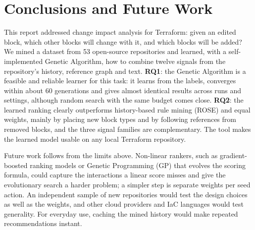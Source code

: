 \section{Conclusions and Future Work}
\label{sec:conclusions}

This report addressed change impact analysis for Terraform: given an edited block, which other
blocks will change with it, and which blocks will be added? We mined a dataset from 53 open-source
repositories and learned, with a self-implemented Genetic Algorithm, how to combine twelve signals
from the repository's history, reference graph and text. \textbf{RQ1}: the Genetic Algorithm is a
feasible and reliable learner for this task: it learns from the labels, converges within about 60
generations and gives almost identical results across runs and settings, although random search
with the same budget comes close. \textbf{RQ2}: the learned ranking clearly outperforms
history-based rule mining (ROSE) and equal weights, mainly by placing new block types and by
following references from removed blocks, and the three signal families are complementary. The
\tool{} tool makes the learned model usable on any local Terraform repository.

Future work follows from the limits above. Non-linear rankers, such as gradient-boosted ranking
models or Genetic Programming (GP) that evolves the scoring formula, could capture the interactions a
linear score misses and give the evolutionary search a harder problem; a simpler step is separate
weights per seed action. An independent sample of new repositories would test the design choices
as well as the weights, and other cloud providers and IaC languages would test generality. For
everyday use, caching the mined history would make repeated recommendations instant.
